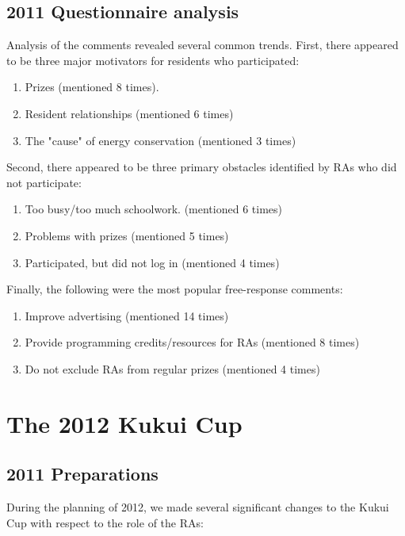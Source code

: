 \documentclass[]{IEEEconf}
\begin{document}
\subsection{2011 Questionnaire analysis}

Analysis of the comments revealed several common trends.  First, there appeared to be three major motivators for residents who participated:

\begin{enumerate}[noitemsep]
\item Prizes (mentioned 8 times).
\item Resident relationships (mentioned 6 times)
\item The "cause" of energy conservation (mentioned 3 times)
\end{enumerate}

\noindent Second, there appeared to be three primary obstacles identified by RAs who did not participate:

\begin{enumerate}[noitemsep]
\item Too busy/too much schoolwork. (mentioned 6 times)
\item Problems with prizes (mentioned 5 times)
\item Participated, but did not log in (mentioned 4 times)
\end{enumerate}

\noindent Finally, the following were the most popular free-response comments:

\begin{enumerate}[noitemsep]
\item Improve advertising (mentioned 14 times)
\item Provide programming credits/resources for RAs (mentioned 8 times)
\item Do not exclude RAs from regular prizes (mentioned 4 times)
\end{enumerate}

\section{The 2012 Kukui Cup}

\subsection{2011 Preparations}

During the planning of 2012, we made several significant changes to the Kukui Cup with
respect to the role of the RAs:
\end{document}

